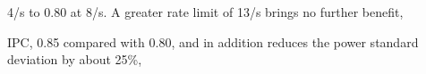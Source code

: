 4\textdegree/s to 0.80 at 8\textdegree/s. A greater rate limit of 13\textdegree/s brings no further benefit,

IPC, 0.85 compared with 0.80, and in addition reduces the power standard deviation by about 25\%,
